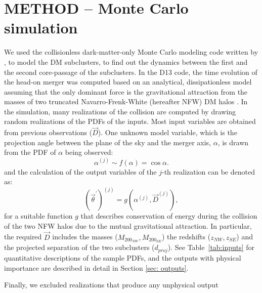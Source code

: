 \section{METHOD -- Monte Carlo simulation} 
We used the collisionless 
dark-matter-only Monte Carlo modeling code written by , to
model the DM subclusters, to find out the dynamics between the first and
the second core-passage of the subclusters. 
In the D13 code, the time evolution of the
head-on merger was computed based on an analytical, dissipationless model
assuming that the only dominant force is the gravitational attraction from
the masses of two truncated Navarro-Frenk-White (hereafter NFW) DM halos
\citep{Navarro96}. 
In the simulation, many realizations of the collision are
computed by drawing random realizations of the PDFs of the inputs. Most
input variables are obtained from previous observations ($\vec{D}$).  One
unknown model variable, which is the projection angle between the plane of the sky
and the merger axis, $\alpha$, is drawn from the PDF of $\alpha$ being
observed: 
\begin{equation}
	\alpha^{(j)} \sim f(\alpha) = \cos \alpha.
\end{equation}
and the calculation of the output variables of the $j$-th realization can be denoted as: 
\begin{equation}
	(\vec{\theta}^\prime)^{(j)} = g(\alpha^{(j)}, \vec{D}^{(j)}), 
\end{equation}    
for a suitable function $g$ that describes conservation of energy during
the collision of the two NFW halos due to the mutual gravitational
attraction.  In particular, the required $\vec{D}$ includes the masses ($M_{200_{NW}},M_{200_{SE}}$) the redshifts ($z_{NW}, z_{SE}$) and the
projected separation of the two subclusters ($d_{proj}$).  See
Table~\ref{tab:inputs} for quantitative descriptions of the sample PDFs, and
the outputs with physical importance are described in detail in Section
\ref{sec: outputs}. \par
Finally, we excluded realizations that produce any unphysical output
